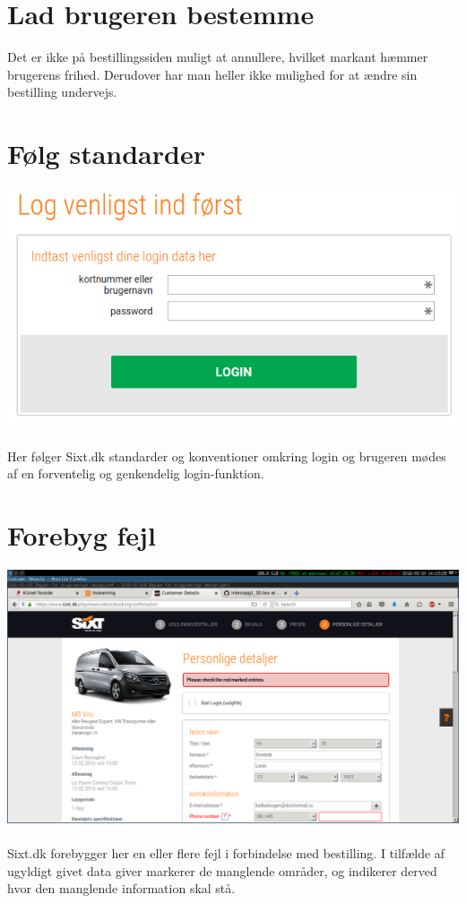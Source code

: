 \documentclass[12pt]{article}
\begin{document}
\newpage

\section{Lad brugeren bestemme}

Det er ikke på bestillingssiden muligt at annullere, hvilket markant hæmmer brugerens frihed. Derudover har man heller ikke mulighed for at ændre sin bestilling undervejs. 


\section{Følg standarder}
\includegraphics[scale=0.5]{img/standard}
\\
\\
Her følger Sixt.dk standarder og konventioner omkring login og brugeren mødes af en forventelig og genkendelig login-funktion.

\newpage

\section{Forebyg fejl}
\includegraphics[scale=0.3]{img/CheckRedMarks}
\\
\\
Sixt.dk forebygger her en eller flere fejl i forbindelse med bestilling. I tilfælde af ugyldigt givet data giver markerer de manglende områder, og indikerer derved hvor den manglende information skal stå.
\\
\\
\end{document}
